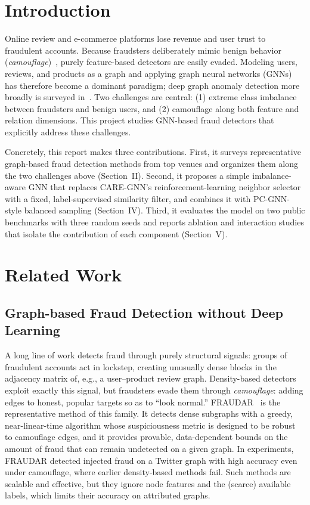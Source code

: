 \documentclass[conference]{IEEEtran}
\begin{document}
\section{Introduction}
Online review and e-commerce platforms lose revenue and user trust to
fraudulent accounts. Because fraudsters deliberately mimic benign behavior
(\emph{camouflage})~\cite{DBLP:conf/kdd/HooiSBSSF16}, purely feature-based
detectors are easily evaded. Modeling users, reviews, and products as a graph
and applying graph neural networks (GNNs) has therefore become a dominant
paradigm; deep graph anomaly detection more broadly is surveyed
in~\cite{DBLP:journals/tkde/MaWXYZSXA23}. Two challenges are central: (1)
extreme class imbalance between fraudsters and benign users, and (2)
camouflage along both feature and relation dimensions. This project studies
GNN-based fraud detectors that explicitly address these challenges.

Concretely, this report makes three contributions. First, it surveys
representative graph-based fraud detection methods from top venues and
organizes them along the two challenges above (Section~II). Second, it
proposes a simple imbalance-aware GNN that replaces CARE-GNN's
reinforcement-learning neighbor selector with a fixed, label-supervised
similarity filter, and combines it with PC-GNN-style balanced sampling
(Section~IV). Third, it evaluates the model on two public benchmarks with
three random seeds and reports ablation and interaction studies that isolate
the contribution of each component (Section~V).

\section{Related Work}
\subsection{Graph-based Fraud Detection without Deep Learning}
A long line of work detects fraud through purely structural signals:
groups of fraudulent accounts act in lockstep, creating unusually dense
blocks in the adjacency matrix of, e.g., a user--product review graph.
Density-based detectors exploit exactly this signal, but fraudsters
evade them through \emph{camouflage}: adding edges to honest, popular
targets so as to ``look normal.'' FRAUDAR~\cite{DBLP:conf/kdd/HooiSBSSF16}
is the representative method of this family. It detects dense subgraphs
with a greedy, near-linear-time algorithm whose suspiciousness metric is
designed to be robust to camouflage edges, and it provides provable,
data-dependent bounds on the amount of fraud that can remain
undetected on a given graph. In experiments, FRAUDAR detected injected
fraud on a Twitter graph with high accuracy even under camouflage, where
earlier density-based methods fail. Such methods are scalable and effective,
but they ignore node features and the (scarce) available labels, which
limits their accuracy on attributed graphs.
\end{document}
